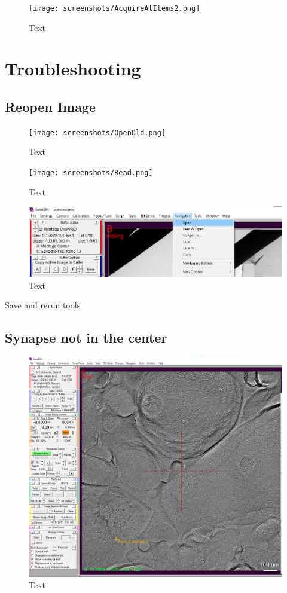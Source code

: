 \documentclass[12pt, a4paper]{scrartcl}
\begin{document}
\begin{figure}[H]
\texttt{[image: screenshots/AcquireAtItems2.png]}
\caption{Text}
\end{figure}

\section{Troubleshooting}

\subsection{Reopen Image}
\begin{figure}[H]
\texttt{[image: screenshots/OpenOld.png]}
\caption{Text}
\end{figure}

\begin{figure}[H]
\texttt{[image: screenshots/Read.png]}
\caption{Text}
\end{figure}

\begin{figure}[H]
\includegraphics[width=\linewidth]{screenshots/OpenNavigator.png}
\caption{Text}
\end{figure}

Save and rerun tools

\subsection{Synapse not in the center}

\begin{figure}[H]
\includegraphics[width=\linewidth]{screenshots/SynapseNotInCenter.png}
\caption{Text}
\end{figure}
\end{document}
